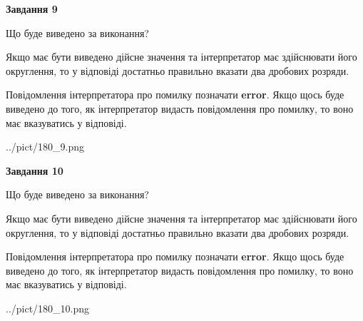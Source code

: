 \documentclass[12pt, ukrainian]{article}
\begin{document}
{\begin {Large}
{\begin {center}\textbf{Завдання 9}\end {center}}\par
Що буде виведено за виконання? \par

Якщо має бути виведено дійсне значення та інтерпретатор має здійснювати його округлення, 
то у відповіді достатньо правильно вказати два дробових розряди.

Повідомлення інтерпретатора про помилку позначати \textbf{error}.
Якщо щось буде виведено до того, як інтерпретатор видасть повідомлення про помилку, 
то воно має вказуватись у відповіді. \par

\begin{center}
	{../pict/180_9.png}
\end{center}
\newpage

{\begin {center}\textbf{Завдання 10}\end {center}}\par
Що буде виведено за виконання? \par

Якщо має бути виведено дійсне значення та інтерпретатор має здійснювати його округлення, 
то у відповіді достатньо правильно вказати два дробових розряди.

Повідомлення інтерпретатора про помилку позначати \textbf{error}.
Якщо щось буде виведено до того, як інтерпретатор видасть повідомлення про помилку, 
то воно має вказуватись у відповіді. \par

\begin{center}
	{../pict/180_10.png}
\end{center}
\newpage

\end {Large}}
\end{document}

